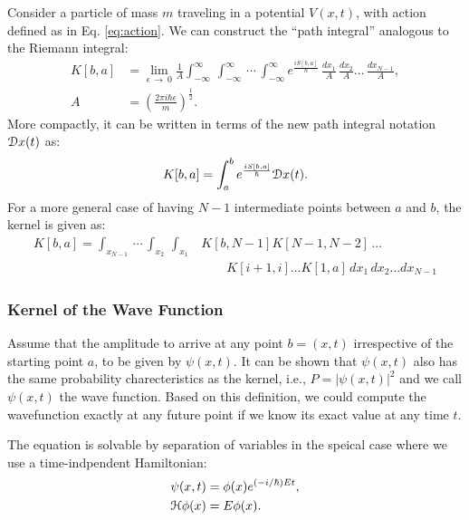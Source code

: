         Consider a particle of mass $m$ traveling in a potential $V(x,t)$, with action defined as in Eq. \eqref{eq:action}. We can construct the ``path integral'' analogous to the Riemann integral:
        \begin{equation}
            \begin{aligned}
                K[b,a] &= \displaystyle\lim_{\epsilon\,\to\ 0} \frac{1}{A}\int_{-\infty}^\infty\,\int_{-\infty}^\infty\,\cdots\,\int_{-\infty}^\infty e^{\frac{iS[b,a]}{\hbar}}\,\frac{dx_1}{A}\,\frac{dx_2}{A}\ldots\,\frac{dx_{N-1}}{A},\\
                A &= {\left( \displaystyle\frac{2\pi i \hbar \epsilon}{m} \right)}^{\frac{1}{2}}.
            \end{aligned}
        \end{equation}
        More compactly, it can be written in terms of the new path integral notation $\mathcal{D} x(t)$ as:
        \begin{equation}
        \label{eq:PI compact kernel}
            K[b,a] = \displaystyle \int_{a}^b e^{\frac{iS[b,a]}{\hbar}} \mathcal{D} x(t).
        \end{equation}
        For a more general case of having $N-1$ intermediate points between $a$ and $b$, the kernel is given as:
        \begin{equation}
            \begin{aligned}
                K[b,a] = \int_{x_{N-1}}\,\cdots\,\int_{x_2}\,\int_{x_1} &K[b,N-1]K[N-1,N-2]\,\ldots\\
                & \qquad K[i+1,i] \ldots K[1,a]\,dx_1\,dx_2\ldots dx_{N-1}
            \end{aligned}
        \end{equation}
        
        \subsubsection{Kernel of the Wave Function}
            Assume that the amplitude to arrive at any point $b = (x,t)$ irrespective of the starting point $a$, to be given by $\psi (x,t)$. It can be shown that $\psi (x,t)$ also has the same probability charecteristics as the kernel, i.e., $P = |\psi (x,t)|^2$ and we call $\psi (x,t)$ the wave function. Based on this definition, we could compute the wavefunction exactly at any future point if we know its exact value at any time $t$.

            The \Schrodinger{} equation is solvable by separation of variables in the speical case where we use a time-indpendent Hamiltonian:
            \begin{equation}
                \label{eq:psi}
                \begin{aligned}
                    \psi(x,t) &= \phi(x)e^{(-i/\hbar)Et},\\
                    \mathcal{H} \phi(x) &= E \phi(x).
                \end{aligned}
            \end{equation}

